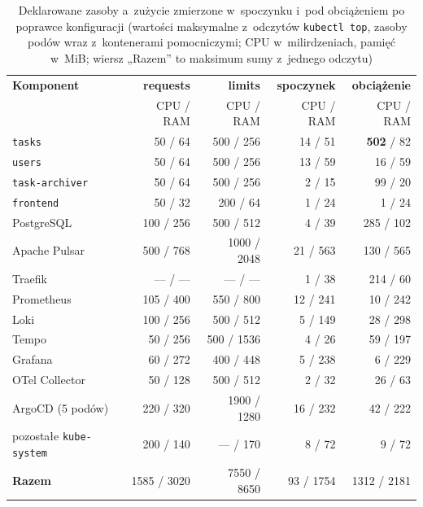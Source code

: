 \begin{table}[H]
  \centering
  \caption{Deklarowane zasoby a~zużycie zmierzone w~spoczynku i~pod obciążeniem po poprawce konfiguracji (wartości maksymalne z~odczytów \texttt{kubectl top}, zasoby podów wraz z~kontenerami pomocniczymi; CPU w~milirdzeniach, pamięć w~MiB; wiersz „Razem” to maksimum sumy z~jednego odczytu)}
  \label{tab:resource-usage}
  \footnotesize
  \begin{tabular}{lrrrr}
    \hline
    \textbf{Komponent} & \textbf{requests} & \textbf{limits} & \textbf{spoczynek} & \textbf{obciążenie} \\
                       & CPU / RAM         & CPU / RAM       & CPU / RAM          & CPU / RAM \\
    \hline
    \texttt{tasks}                 & 50 / 64    & 500 / 256    & 14 / 51   & \textbf{502} / 82 \\
    \texttt{users}                 & 50 / 64    & 500 / 256    & 13 / 59   & 16 / 59 \\
    \texttt{task-archiver}         & 50 / 64    & 500 / 256    & 2 / 15    & 99 / 20 \\
    \texttt{frontend}              & 50 / 32    & 200 / 64     & 1 / 24    & 1 / 24 \\
    PostgreSQL                     & 100 / 256  & 500 / 512    & 4 / 39    & 285 / 102 \\
    Apache Pulsar                  & 500 / 768  & 1000 / 2048  & 21 / 563  & 130 / 565 \\
    Traefik                        & --- / ---  & --- / ---    & 1 / 38    & 214 / 60 \\
    \hline
    Prometheus                     & 105 / 400  & 550 / 800    & 12 / 241  & 10 / 242 \\
    Loki                           & 100 / 256  & 500 / 512    & 5 / 149   & 28 / 298 \\
    Tempo                          & 50 / 256   & 500 / 1536   & 4 / 26    & 59 / 197 \\
    Grafana                        & 60 / 272   & 400 / 448    & 5 / 238   & 6 / 229 \\
    OTel Collector                 & 50 / 128   & 500 / 512    & 2 / 32    & 26 / 63 \\
    \hline
    ArgoCD (5 podów)               & 220 / 320  & 1900 / 1280  & 16 / 232  & 42 / 222 \\
    pozostałe \texttt{kube-system} & 200 / 140  & --- / 170    & 8 / 72    & 9 / 72 \\
    \hline
    \textbf{Razem}                 & 1585 / 3020 & 7550 / 8650 & 93 / 1754 & 1312 / 2181 \\
    \hline
  \end{tabular}
\end{table}

